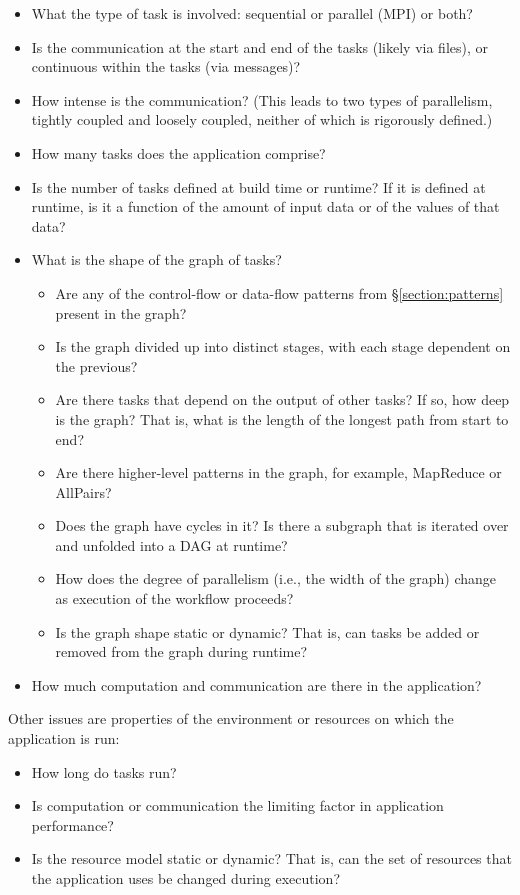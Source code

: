 \documentclass[10pt,letterpaper]{article}
\begin{document}
\begin{itemize}
\item What the type of task is involved: sequential or parallel (MPI) or both?
\item Is the communication at the start and end of the tasks (likely via files), or continuous within the tasks (via messages)?
\item How intense is the communication? (This leads to two types of parallelism, tightly coupled and loosely coupled, neither of which is rigorously defined.)
\item How many tasks does the application comprise?
\item Is the number of tasks defined at build time or runtime?  If it is defined at runtime, is it a function of the amount of input data or of the values of that data?
\item What is the shape of the graph of tasks? 
\begin{itemize}
\item Are any of the control-flow or data-flow patterns from \S\ref{section:patterns} present in the graph?
\item Is the graph divided up into distinct stages, with each stage dependent
on the previous?
\item Are there tasks that depend on the output of other tasks?  If so, how deep is the graph? That is, what is the length of the longest path from start to end?
\item Are there higher-level patterns in the graph, for example, MapReduce or AllPairs?
\item Does the graph have cycles in it? Is there a subgraph that is 
    iterated over and unfolded into a DAG at runtime?
\item How does the degree of parallelism (i.e., the width of the graph) change 
    as execution of the workflow proceeds?
\item Is the graph shape static or dynamic? That is, can tasks be added
    or removed from the graph during runtime?
\end{itemize}
\item How much computation and communication are there in the application?
\end{itemize}

Other issues are properties of the environment or resources on which the application is run:

\begin{itemize}
\item How long do tasks run? 
\item Is computation or communication the limiting factor in application performance?
\item Is the resource model static or dynamic? That is, can the set of resources that the application uses be changed during execution?
\end{itemize}
\end{document}
